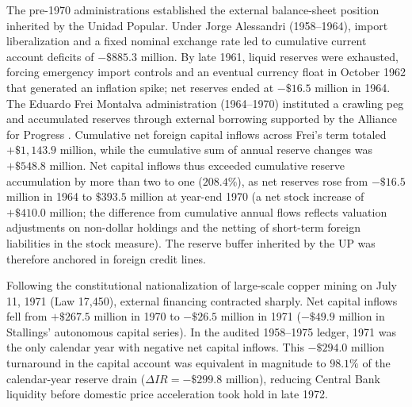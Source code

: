 The pre-1970 administrations established the external balance-sheet position inherited by the Unidad Popular. Under Jorge Alessandri (1958--1964), import liberalization and a fixed nominal exchange rate led to cumulative current account deficits of $-\$885.3$ million. By late 1961, liquid reserves were exhausted, forcing emergency import controls and an eventual currency float in October 1962 that generated an inflation spike; net reserves ended at $-\$16.5$ million in 1964. The Eduardo Frei Montalva administration (1964--1970) instituted a crawling peg and accumulated reserves through external borrowing supported by the Alliance for Progress \citep{FfrenchDavis1973}. Cumulative net foreign capital inflows across Frei's term totaled $+\$1,143.9$ million, while the cumulative sum of annual reserve changes was $+\$548.8$ million. Net capital inflows thus exceeded cumulative reserve accumulation by more than two to one ($208.4\%$), as net reserves rose from $-\$16.5$ million in 1964 to $\$393.5$ million at year-end 1970 (a net stock increase of $+\$410.0$ million; the difference from cumulative annual flows reflects valuation adjustments on non-dollar holdings and the netting of short-term foreign liabilities in the stock measure). The reserve buffer inherited by the UP was therefore anchored in foreign credit lines.

Following the constitutional nationalization of large-scale copper mining on July 11, 1971 (Law 17,450), external financing contracted sharply. Net capital inflows fell from $+\$267.5$ million in 1970 to $-\$26.5$ million in 1971 ($-\$49.9$ million in Stallings' autonomous capital series). In the audited 1958--1975 ledger, 1971 was the only calendar year with negative net capital inflows. This $-\$294.0$ million turnaround in the capital account was equivalent in magnitude to $98.1\%$ of the calendar-year reserve drain ($\Delta IR = -\$299.8$ million), reducing Central Bank liquidity before domestic price acceleration took hold in late 1972.


